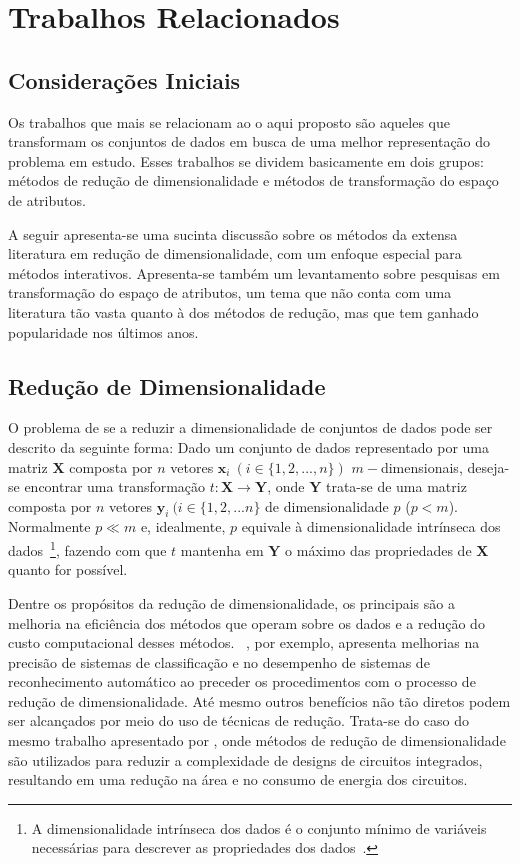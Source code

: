 \chapter{Trabalhos Relacionados}\label{chap:revisao}

\section{Considerações Iniciais}

Os trabalhos que mais se relacionam ao o aqui proposto são aqueles que transformam os conjuntos de dados em busca de uma melhor representação do problema em estudo. Esses trabalhos se dividem basicamente em dois grupos: métodos de redução de dimensionalidade e métodos de transformação do espaço de atributos. 

A seguir apresenta-se uma sucinta discussão sobre os métodos da extensa literatura em redução de dimensionalidade, com um enfoque especial para métodos interativos. Apresenta-se também um levantamento sobre pesquisas em transformação do espaço de atributos, um tema que não conta com uma literatura tão vasta quanto à dos métodos de redução, mas que tem ganhado popularidade nos últimos anos.

\section{Redução de Dimensionalidade}

O problema de se a reduzir a dimensionalidade de conjuntos de dados pode ser descrito da seguinte forma: Dado um conjunto de dados representado por uma matriz $\textbf{X}$ composta por $n$ vetores $\textbf{x}_i~(i \in \{1,2,...,n\})$ $m-$dimensionais, deseja-se encontrar uma transformação $t: \textbf{X} \rightarrow \textbf{Y}$, onde $\textbf{Y}$ trata-se de uma matriz composta por $n$ vetores $\textbf{y}_i~(i \in \{1,2,...n\}$ de dimensionalidade $p$ ($p < m$). Normalmente $p \ll m$ e, idealmente, $p$ equivale à dimensionalidade intrínseca dos dados~\footnote{A dimensionalidade intrínseca dos dados é o  conjunto mínimo de variáveis necessárias para descrever as propriedades dos dados~\cite{Fukunaga1990}.}, fazendo com que $t$ mantenha em $\textbf{Y}$ o máximo das propriedades de $\textbf{X}$ quanto for possível. 

Dentre os propósitos da redução de dimensionalidade, os principais são a melhoria na eficiência dos métodos que operam sobre os dados e a redução do custo computacional desses métodos. \citeauthor{Konig2000}~\cite{Konig2000}, por exemplo, apresenta melhorias na precisão de sistemas de classificação e no desempenho de sistemas de reconhecimento automático ao preceder os procedimentos com o processo de redução de dimensionalidade. Até mesmo outros benefícios não tão diretos podem ser alcançados por meio do uso de técnicas de redução. Trata-se do caso do mesmo trabalho apresentado por \citeauthor{Konig2000}, onde métodos de redução de dimensionalidade são utilizados para reduzir a complexidade de designs de circuitos integrados, resultando em uma redução na área e no consumo de energia dos circuitos.

